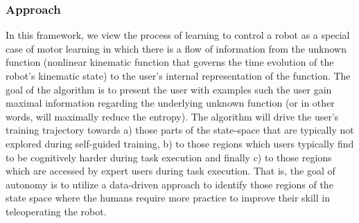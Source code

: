 \documentclass[12pt]{article}
\begin{document}
%	
%
%
%
%
%
%
\subsubsection{Approach}\label{sssec:learning_approach}
In this framework, we view the process of learning to control a robot as a special case of motor learning in which there is a flow of information from the unknown function (nonlinear kinematic function that governs the time evolution of the robot's kinematic state) to the user's internal representation of the function. The goal of the algorithm is to present the user with examples such the user gain maximal information regarding the underlying unknown function (or in other words, will maximally reduce the entropy). The algorithm will drive the user's training trajectory towards a) those parts of the state-space that are typically not explored during self-guided training, b) to those regions which users typically find to be cognitively harder during task execution and finally c) to those regions which are accessed by expert users during task execution. That is, the goal of autonomy is to utilize a data-driven approach to identify those regions of the state space where the humans require more practice to improve their skill in teleoperating the robot. 
\end{document}
